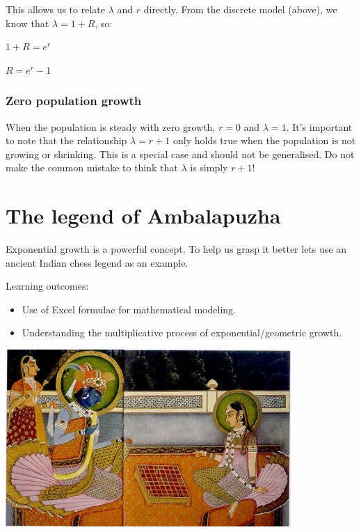 \documentclass[
  a4paper]{book}
\providecommand{\tightlist}{%
  \setlength{\itemsep}{0pt}\setlength{\parskip}{0pt}}
\begin{document}
This allows us to relate \(\lambda\) and \(r\) directly. From the discrete model (above), we know that \(\lambda = 1 + R\), so:

\(1+R = e^r\)

\(R = e^r - 1\)

\hypertarget{zero-population-growth}{%
\subsection{Zero population growth}\label{zero-population-growth}}

When the population is steady with zero growth, \(r = 0\) and \(\lambda = 1\). It's important to note that the relationship \(\lambda = r + 1\) only holds true when the population is not growing or shrinking. This is a special case and should not be generalised. Do not make the common mistake to think that \(\lambda\) is simply \(r + 1\)!

\hypertarget{the-legend-of-ambalapuzha}{%
\chapter{The legend of Ambalapuzha}\label{the-legend-of-ambalapuzha}}

Exponential growth is a powerful concept. To help us grasp it better lets use an ancient Indian chess legend as an example.

\begin{do-something}
Learning outcomes:

\begin{itemize}
\tightlist
\item
  Use of Excel formulae for mathematical modeling.
\item
  Understanding the multiplicative process of exponential/geometric
  growth.
\end{itemize}
\end{do-something}

\begin{center}\includegraphics[width=0.5\linewidth]{images/Radha-Krishna_chess} \end{center}
\end{document}
